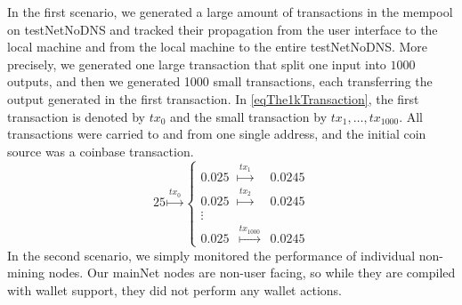 \documentclass{article}
\begin{document}
In the first scenario, we generated a large amount of transactions in the mempool on testNetNoDNS and tracked their propagation from the user interface to the local machine and from the local machine to the entire testNetNoDNS. More precisely, we generated one large transaction that split one input into $1000$ outputs, and then we generated 1000 small transactions, each transferring the output generated in the first transaction. In \eqref{eqThe1kTransaction}, the first transaction is denoted by $tx_0$ and the small transaction by $tx_{1},\dots, tx_{1000}$. All transactions were carried to and from one single address, and the initial coin source was a coinbase transaction.
\begin{equation}\label{eqThe1kTransaction}
25 \stackrel{tx_0}{\mapsto} \left\{\begin{array}{lcl}
0.025 & \stackrel{tx_1}{\mapsto}& 0.0245 \\
0.025 & \stackrel{tx_2}{\mapsto}& 0.0245\\
\vdots\\
0.025 & \stackrel{tx_{1000}}{\mapsto}& 0.0245
\end{array} \right.
\end{equation}
In the second scenario, we simply monitored the performance of individual non-mining nodes. Our mainNet nodes are non-user facing, so while they are compiled with wallet support, they did not perform any wallet actions.





\end{document}
